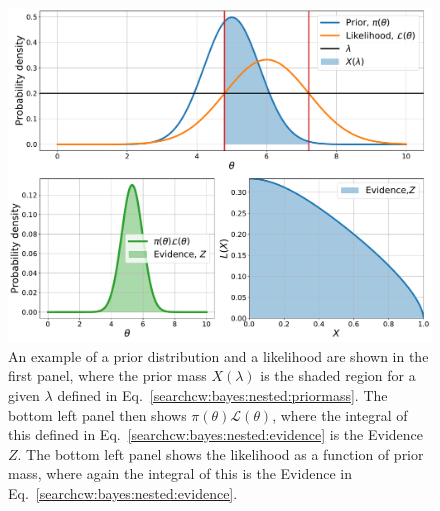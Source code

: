 \begin{figure}[ht]
	\centering
	\includegraphics[width=0.8\linewidth]{C2_cw/nested_plots.pdf}
	\caption[Nested sampling]{An example of a prior distribution and a likelihood are shown in the first panel, where the prior mass $X(\lambda)$ is the shaded region for a given $\lambda$ defined in Eq.~\ref{searchcw:bayes:nested:priormass}. The bottom left panel then shows $\pi(\theta)\mathcal{L}(\theta)$, where the integral of this defined in Eq.~\ref{searchcw:bayes:nested:evidence} is the Evidence $Z$. The bottom left panel shows the likelihood as a function of prior mass, where again the integral of this is the Evidence in Eq.~\ref{searchcw:bayes:nested:evidence}.}
	\label{cwinto:bayes:nestedsampling:plots}
\end{figure}
%

